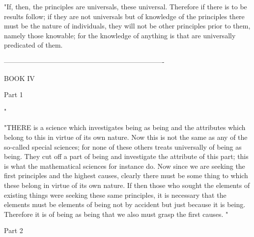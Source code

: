"If, then, the principles are universals, these universal. Therefore
if there is to be results follow; if they are not universals but of
knowledge of the principles there must be the nature of individuals,
they will not be other principles prior to them, namely those knowable;
for the knowledge of anything is that are universally predicated of
them. 

----------------------------------------------------------------------

BOOK IV

Part 1 

"

"THERE is a science which investigates being as being and the attributes
which belong to this in virtue of its own nature. Now this is not
the same as any of the so-called special sciences; for none of these
others treats universally of being as being. They cut off a part of
being and investigate the attribute of this part; this is what the
mathematical sciences for instance do. Now since we are seeking the
first principles and the highest causes, clearly there must be some
thing to which these belong in virtue of its own nature. If then those
who sought the elements of existing things were seeking these same
principles, it is necessary that the elements must be elements of
being not by accident but just because it is being. Therefore it is
of being as being that we also must grasp the first causes.
"

Part 2 

